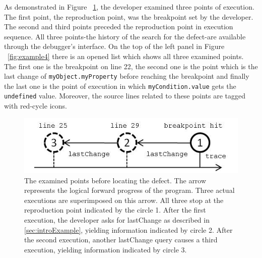 \documentclass[preprint]{sigplanconf}
\begin{document}
As demonstrated in Figure ~\ref{fig:example-points}, the developer
examined three points of execution. The first point, the reproduction point,  was the breakpoint set by the developer.
The second and third points preceded the reproduction point in execution sequence.
All three points-the history
of the search for the defect-are available through the debugger's
interface. On the top of the left panel in Figure ~\ref{fig:example4}
there is an opened list which shows all three examined points. The
first one is the breakpoint on line 22, the second one is the point
which is the last change of \texttt{myObject.myProperty} before
reaching the breakpoint and finally the last one is the point of
execution in which \texttt{myCondition.value} gets the
\texttt{undefined} value. Moreover, the source lines related to these
points are tagged with red-cycle icons.

\begin{figure}[htp]
\includegraphics{5-example-points.jpg}
\caption{The examined points before locating the defect. The arrow represents the logical forward progress of the program. Three actual executions are superimposed on this arrow. All three stop at the reproduction point indicated by the circle 1. After the first execution, the developer asks for lastChange as described in \ref{sec:introExample}, yielding information  indicated by circle 2. After the second execution, another lastChange query causes a third execution, yielding information indicated by circle 3.}
\label{fig:example-points}
\end{figure}
\end{document}

